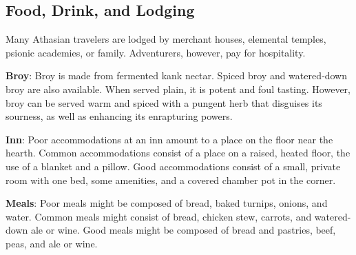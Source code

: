 \subsection{Food, Drink, and Lodging}
Many Athasian travelers are lodged by merchant houses, elemental temples, psionic academies, or family. Adventurers, however, pay for hospitality.


\textbf{Broy}: Broy is made from fermented kank nectar. Spiced broy and watered‐down broy are also available. When served plain, it is potent and foul tasting. However, broy can be served warm and spiced with a pungent herb that disguises its sourness, as well as enhancing its enrapturing powers.

\textbf{Inn}: Poor accommodations at an inn amount to a place on the floor near the hearth. Common accommodations consist of a place on a raised, heated floor, the use of a blanket and a pillow. Good accommodations consist of a small, private room with one bed, some amenities, and a covered chamber pot in the corner.

\textbf{Meals}: Poor meals might be composed of bread, baked turnips, onions, and water. Common meals might consist of bread, chicken stew, carrots, and watered-down ale or wine. Good meals might be composed of bread and pastries, beef, peas, and ale or wine.